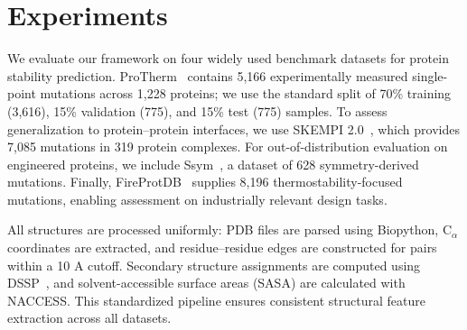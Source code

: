 \documentclass[11pt]{article}
\begin{document}
\section{Experiments}
\label{sec:experiments}


We evaluate our framework on four widely used benchmark datasets for protein
stability prediction. ProTherm~\cite{kumar2006protherm} contains 5,166
experimentally measured single-point mutations across 1,228 proteins; we use
the standard split of 70\% training (3,616), 15\% validation (775), and 15\% test
(775) samples. To assess generalization to protein–protein interfaces, we use
SKEMPI 2.0~\cite{jankauskaite2019skempi}, which provides 7,085 mutations in
319 protein complexes. For out-of-distribution evaluation on engineered
proteins, we include Ssym~\cite{kellogg2011role}, a dataset of 628
symmetry-derived mutations. Finally, FireProtDB~\cite{stourac2021fireprotdb}
supplies 8,196 thermostability-focused mutations, enabling assessment on
industrially relevant design tasks.

All structures are processed uniformly: PDB files are parsed using Biopython,
C$_\alpha$ coordinates are extracted, and residue–residue edges are constructed
for pairs within a 10 A cutoff. Secondary structure assignments are computed
using DSSP~\cite{kabsch1983dssp}, and solvent-accessible surface areas (SASA)
are calculated with NACCESS. This standardized pipeline ensures consistent
structural feature extraction across all datasets.


\end{document}

